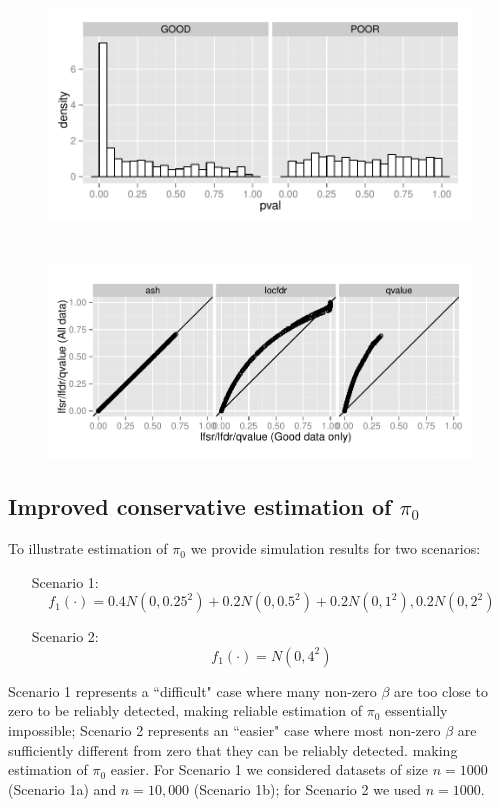 \documentclass[10pt]{article}
\begin{document}
\begin{figure}[!ht] \label{fig:good_poor_hist}
\begin{center}
\includegraphics[height=3in]{Rcode/figures/good_poor_hist.pdf}
\includegraphics[width=6.5in]{Rcode/figures/good_vs_all.pdf}
\end{center}
\caption{}
\end{figure}


\subsection*{Improved conservative estimation of $\pi_0$}

To illustrate estimation of $\pi_0$ we provide simulation results for two scenarios:
\begin{enumerate}
\item[Scenario 1:]
\begin{equation}
f_1(\cdot) =  0.4 N(0,0.25^2) + 0.2 N(0,0.5^2) + 0.2 N(0,1^2), 0.2 N(0,2^2)
\end{equation}
\item[Scenario 2:]
\begin{equation}
f_1(\cdot) = N(0,4^2)
\end{equation}
\end{enumerate}
Scenario 1 represents a ``difficult" case where many non-zero $\beta$ are
too close to  zero to be reliably detected, making reliable estimation of $\pi_0$ essentially impossible; 
Scenario 2 represents an ``easier" case where most non-zero $\beta$ are
sufficiently different from zero that they can be reliably detected. making estimation of $\pi_0$ easier.
For Scenario 1 we considered datasets of size $n=1000$ (Scenario 1a) and $n=10,000$ (Scenario 1b);
for Scenario 2 we used $n=1000$.
\end{document}
